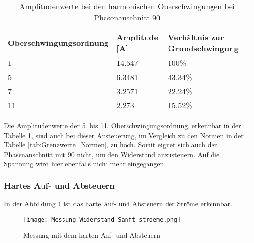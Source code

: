 \begin{table}[ht!]
	\centering
	\begin{tabular}{|l|l|l|}
		\hline
		Oberschwingungsordnung 	& Amplitude [A] & Verhältnis zur Grundschwingung	\\ \hline
		1       				& 14.647   		& 100\%								\\ \hline
		5      					& 6.3481    	& 43.34\%							\\ \hline
		7      					& 3.2571    	& 22.24\%							\\ \hline
		11      				& 2.273    		& 15.52\%							\\ \hline
	\end{tabular}
	\caption{Amplitudenwerte bei den harmonischen Oberschwingungen bei Phasenanschnitt 90\textdegree}\label{tab:Phas_90_Stroeme}
\end{table}

Die Amplitudenwerte der 5. bis 11. Oberschwingungsordnung, erkennbar in der Tabelle \ref{tab:Phas_90_Stroeme}, sind auch bei dieser Ansteuerung, im Vergleich zu den Normen in der Tabelle \ref{tab:Grenzwerte_Normen}, zu hoch. Somit eignet sich auch der Phasenanschnitt mit 90\textdegree \hspace{0.02cm} nicht, um den Widerstand anzusteuern. Auf die Spannung wird hier ebenfalls nicht mehr eingegangen. 


\newpage
\subsubsection*{Hartes Auf- und Absteuern}

In der Abbildung \ref{fig:Mess_Widerstand_Sanft_stroeme} ist das harte Auf- und Absteuern der Ströme erkennbar. 

\begin{figure}[ht!]
	\centering
	\texttt{[image: Messung\_Widerstand\_Sanft\_stroeme.png]}	
	\caption{Messung mit dem harten Auf- und Absteuern}\label{fig:Mess_Widerstand_Sanft_stroeme}
\end{figure}


